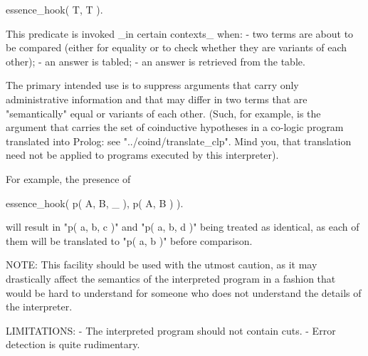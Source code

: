           essence\_hook( T, T ).

       This predicate is invoked \_in certain contexts\_ when:
          - two terms are about to be compared (either for equality or to
            check whether they are variants of each other);
          - an answer is tabled;
          - an answer is retrieved from the table.

       The primary intended use is to suppress arguments that carry only
       administrative information and that may differ in two terms that are
       "semantically" equal or variants of each other. (Such, for example, is
       the argument that carries the set of coinductive hypotheses in a
       co-logic program translated into Prolog: see "../coind/translate\_clp".
       Mind you, that translation need not be applied to programs executed by
       this interpreter).

       For example, the presence of

          essence\_hook( p( A, B, \_ ),  p( A, B ) ).

       will result in "p( a, b, c )" and "p( a, b, d )" being treated as
       identical, as each of them will be translated to "p( a, b )" before
       comparison.

       NOTE: This facility should be used with the utmost caution, as it
             may drastically affect the semantics of the interpreted program
             in a fashion that would be hard to understand for someone who
             does not understand the details of the interpreter.

 LIMITATIONS: - The interpreted program should not contain cuts.
              - Error detection is quite rudimentary.
